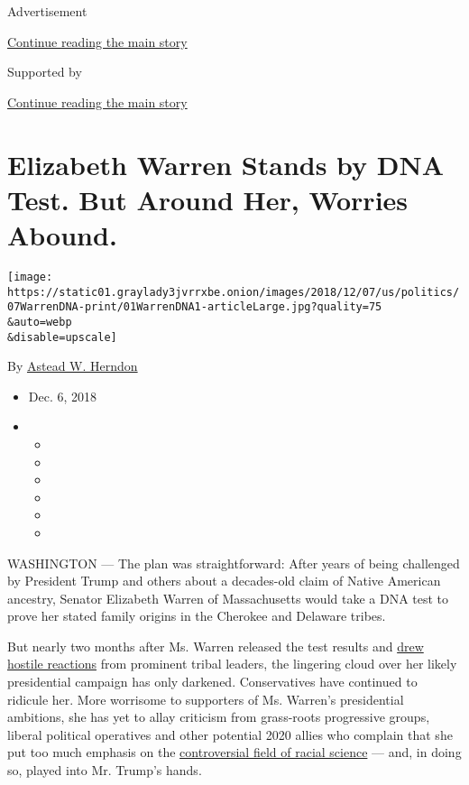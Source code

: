 Advertisement

\protect\hyperlink{after-top}{Continue reading the main story}

Supported by

\protect\hyperlink{after-sponsor}{Continue reading the main story}

\hypertarget{elizabeth-warren-stands-by-dna-test-but-around-her-worries-abound}{%
\section{Elizabeth Warren Stands by DNA Test. But Around Her, Worries
Abound.}\label{elizabeth-warren-stands-by-dna-test-but-around-her-worries-abound}}

\texttt{[image: https://static01.graylady3jvrrxbe.onion/images/2018/12/07/us/politics/07WarrenDNA-print/01WarrenDNA1-articleLarge.jpg?quality=75\\\&auto=webp\\\&disable=upscale]}

By \href{https://www.nytimes3xbfgragh.onion/by/astead-w-herndon}{Astead
W. Herndon}

\begin{itemize}
\item
  Dec. 6, 2018
\item
  \begin{itemize}
  \item
  \item
  \item
  \item
  \item
  \item
  \end{itemize}
\end{itemize}

WASHINGTON --- The plan was straightforward: After years of being
challenged by President Trump and others about a decades-old claim of
Native American ancestry, Senator Elizabeth Warren of Massachusetts
would take a DNA test to prove her stated family origins in the Cherokee
and Delaware tribes.

But nearly two months after Ms. Warren released the test results and
\href{https://www.nytimes3xbfgragh.onion/2018/10/15/us/politics/elizabeth-warren-dna-ancestry.html}{drew
hostile reactions} from prominent tribal leaders, the lingering cloud
over her likely presidential campaign has only darkened. Conservatives
have continued to ridicule her. More worrisome to supporters of Ms.
Warren's presidential ambitions, she has yet to allay criticism from
grass-roots progressive groups, liberal political operatives and other
potential 2020 allies who complain that she put too much emphasis on the
\href{https://www.nytimes3xbfgragh.onion/2018/10/17/us/politics/elizabeth-warren-dna-test.html}{controversial
field of racial science} --- and, in doing so, played into Mr. Trump's
hands.

